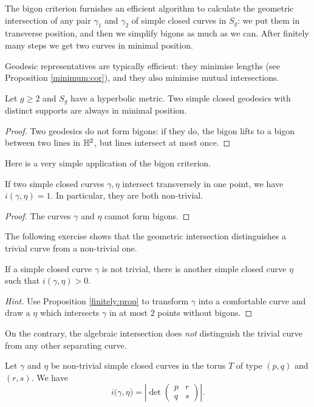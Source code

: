 The bigon criterion furnishes an efficient algorithm to calculate the geometric intersection of any pair $\gamma_1$ and $\gamma_2$ of simple closed curves in $S_g$: we put them in transverse position, and then we simplify bigons as much as we can. After finitely many steps we get two curves in minimal position.

Geodesic representatives are typically efficient: they minimise lengths (see Proposition  \ref{minimum:cor}), and they also minimise mutual intersections.

\begin{cor} \label{geodetiche:cor}
Let $g\geqslant 2$ and $S_g$ have a hyperbolic metric. Two simple closed geodesics with distinct supports are always in minimal position.
\end{cor}
\begin{proof}
Two geodesics do not form bigons: if they do, the bigon lifts to a bigon between two lines in $\mathbb{H}^2$, but lines intersect at most once.
\end{proof}

Here is a very simple application of the bigon criterion.

\begin{cor} If two simple closed curves $\gamma, \eta$ intersect transversely in one point, we have $i(\gamma,\eta)=1$. In particular, they are both non-trivial.
\end{cor}
\begin{proof}
The curves $\gamma$ and $\eta$ cannot form bigons.
\end{proof}

The following exercise shows that the geometric intersection distinguishes a trivial curve from a non-trivial one.

\begin{ex} \label{eta:prop}
If a simple closed curve $\gamma$ is not trivial, there is another simple closed curve $\eta$ such that $i(\gamma, \eta)>0$.
\end{ex}
\begin{proof}[Hint] Use Proposition \ref{finitely:prop} to transform $\gamma$ into a comfortable curve and draw a $\eta$ which intersects $\gamma$ in at most $2$ points without bigons.
\end{proof}

On the contrary, the algebraic intersection does \emph{not} distinguish the trivial curve from any other separating curve.

\begin{ex} \label{i:torus:ex}
Let $\gamma$ and $\eta$ be non-trivial simple closed curves in the torus $T$ of type $(p,q)$ and $(r,s)$. We have
$$i(\gamma, \eta \big) = \left|\det \begin{pmatrix} p & r \\ q & s \end{pmatrix}\right|.$$
\end{ex}


